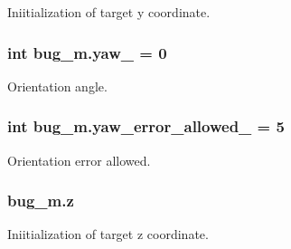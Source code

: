 Iniitialization of target y coordinate. 

\subsubsection[{\texorpdfstring{yaw\+\_\+}{yaw_}}]{\setlength{\rightskip}{0pt plus 5cm}int bug\+\_\+m.\+yaw\+\_\+ = 0}\hypertarget{namespacebug__m_a8b5b5c9259592b8efd526c5adb95d95b}{}\label{namespacebug__m_a8b5b5c9259592b8efd526c5adb95d95b}


Orientation angle. 

\subsubsection[{\texorpdfstring{yaw\+\_\+error\+\_\+allowed\+\_\+}{yaw_error_allowed_}}]{\setlength{\rightskip}{0pt plus 5cm}int bug\+\_\+m.\+yaw\+\_\+error\+\_\+allowed\+\_\+ = 5}\hypertarget{namespacebug__m_a23e5e76f14d9d0d139767cb229a53dda}{}\label{namespacebug__m_a23e5e76f14d9d0d139767cb229a53dda}


Orientation error allowed. 

\subsubsection[{\texorpdfstring{z}{z}}]{\setlength{\rightskip}{0pt plus 5cm}bug\+\_\+m.\+z}\hypertarget{namespacebug__m_afbb54887da57b97920c8d36c6daed1fc}{}\label{namespacebug__m_afbb54887da57b97920c8d36c6daed1fc}


Iniitialization of target z coordinate. 

